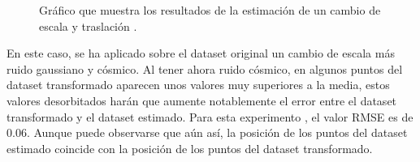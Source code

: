 \begin{figure}
\begin{center}
\hspace{0.5cm}

\end{center}

\caption{Gráfico que muestra los resultados de la estimación de un cambio de escala y traslación .}
\end{figure}

En este caso, se ha aplicado sobre el dataset original un cambio de escala más ruido gaussiano y cósmico. Al tener ahora ruido cósmico, en algunos puntos del dataset transformado aparecen unos valores muy superiores a la media, estos valores desorbitados harán que aumente notablemente el error entre el dataset transformado y el dataset estimado. Para esta experimento , el valor RMSE es de 0.06. Aunque puede observarse que aún así, la posición de los puntos del dataset estimado coincide con la posición de los puntos del dataset transformado.

